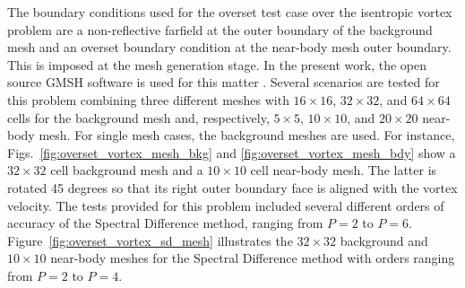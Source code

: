 The boundary conditions used for the overset test case over the isentropic vortex problem are a non-reflective farfield at the outer boundary of the background mesh and an overset boundary condition at the near-body mesh outer boundary. This is imposed at the mesh generation stage. In the present work, the open source GMSH software is used for this matter \cite{Geuzaine2009Gmsh}. Several scenarios are tested for this problem combining three different meshes with $16 \times 16$, $32 \times 32$, and $64 \times 64$ cells for the background mesh and, respectively, $5 \times 5$, $10 \times 10$, and $20 \times 20$ near-body mesh. For single mesh cases, the background meshes are used. For instance, Figs.\ \ref{fig:overset_vortex_mesh_bkg} and \ref{fig:overset_vortex_mesh_bdy} show a $32 \times 32$ cell background mesh and a $10 \times 10$ cell near-body mesh. The latter is rotated 45 degrees so that its right outer boundary face is aligned with the vortex velocity. The tests provided for this problem included several different orders of accuracy of the Spectral Difference method, ranging from $P=2$ to $P=6$. Figure\ \ref{fig:overset_vortex_sd_mesh} illustrates the $32 \times 32$ background and $10 \times 10$ near-body meshes for the Spectral Difference method with orders ranging from $P=2$ to $P=4$.
